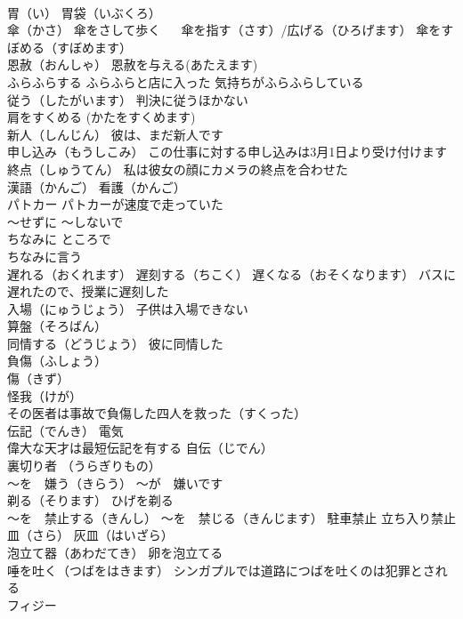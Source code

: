 \documentclass[8pt]{extreport}
\begin{document}
\begin{CJK}{UTF8}{min}
\\	胃（い） 胃袋（いぶくろ）
\\	傘（かさ） 傘をさして歩く 　 傘を指す（さす）/広げる（ひろげます） 傘をすぼめる（すぼめます）
\\	恩赦（おんしゃ） 恩赦を与える(あたえます)
\\	ふらふらする ふらふらと店に入った 気持ちがふらふらしている
\\	従う（したがいます） 判決に従うほかない
\\	肩をすくめる (かたをすくめます)
\\	新人（しんじん） 彼は、まだ新人です
\\	申し込み（もうしこみ） この仕事に対する申し込みは3月1日より受け付けます
\\	終点（しゅうてん） 私は彼女の顔にカメラの終点を合わせた
\\	漢語（かんご） 看護（かんご）
\\	パトカー パトカーが速度で走っていた
\\	～せずに ～しないで
\\	ちなみに ところで
\\	ちなみに言う
\\	遅れる（おくれます） 遅刻する（ちこく） 遅くなる（おそくなります） バスに遅れたので、授業に遅刻した
\\	入場（にゅうじょう） 子供は入場できない
\\	算盤（そろばん）
\\	同情する（どうじょう） 彼に同情した
\\	負傷（ふしょう）
\\	傷（きず）
\\	怪我（けが）
\\	その医者は事故で負傷した四人を救った（すくった）
\\	伝記（でんき） 電気 
\\	偉大な天才は最短伝記を有する 自伝（じでん）
\\	裏切り者 （うらぎりもの）
\\	～を　嫌う（きらう） ～が　嫌いです
\\	剃る（そります） ひげを剃る
\\	～を　禁止する（きんし） ～を　禁じる（きんじます） 駐車禁止 立ち入り禁止
\\	皿（さら） 灰皿（はいざら）
\\	泡立て器（あわだてき） 卵を泡立てる
\\	唾を吐く（つばをはきます） シンガプルでは道路につばを吐くのは犯罪とされる
\\	フィジー

\end{CJK}
\end{document}
